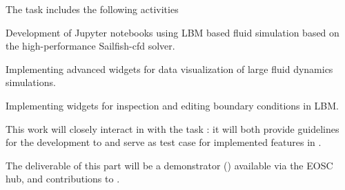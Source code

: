 \begin{task}[
  title=Application: Visualisation and control of fluid dynamics in Jupyter notebook,
  id=application-gpu,
  lead=SIL,
  PM=13,
  wphases={4-36},
  partners={EGI}
]
The task includes the following activities
\begin{compactitem}
\item Development of Jupyter notebooks using LBM based fluid
  simulation based on the high-performance Sailfish-cfd solver.
\item Implementing advanced widgets for data visualization of large
  fluid dynamics simulations.
\item Implementing widgets for inspection and editing boundary
  conditions in LBM.
\end{compactitem}

This work will closely interact in with the task
: it will both provide guidelines
for the development to  and serve
as test case for implemented features in
.

The deliverable of this part will be a demonstrator
() available via the EOSC hub, and
contributions to .

\end{task}
